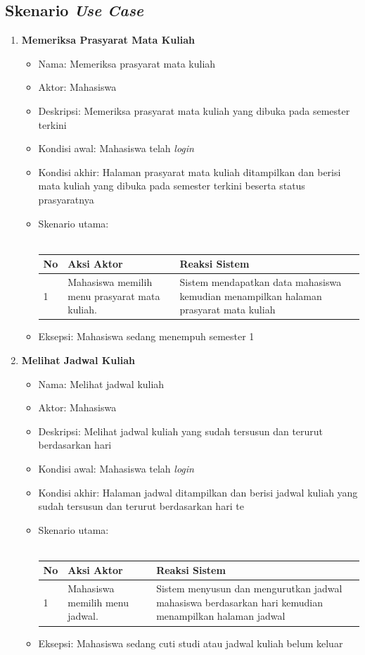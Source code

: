 \subsection{Skenario \textit{Use Case}}

\begin{enumerate}
	\item \textbf{Memeriksa Prasyarat Mata Kuliah}
		\begin{itemize}
			\item Nama: Memeriksa prasyarat mata kuliah
			\item Aktor: Mahasiswa
			\item Deskripsi: Memeriksa prasyarat mata kuliah yang dibuka pada semester terkini
			\item Kondisi awal: Mahasiswa telah \textit{login}
			\item Kondisi akhir: Halaman prasyarat mata kuliah ditampilkan dan berisi mata kuliah yang dibuka pada semester terkini beserta status prasyaratnya
			\item Skenario utama: \\ \\
				\begin{tabular}{|p{0.5cm} |p{6cm}| p{6cm}|}
						\hline
							No 	& Aksi Aktor & Reaksi Sistem \\ \hline
							1 	& Mahasiswa memilih menu prasyarat mata kuliah. 	&	Sistem mendapatkan data mahasiswa kemudian menampilkan halaman prasyarat mata kuliah \\ \hline 
						\end{tabular} 
			\item Eksepsi: Mahasiswa sedang menempuh semester 1
		\end{itemize}
		
	\item \textbf{Melihat Jadwal Kuliah}
		\begin{itemize}
			\item Nama: Melihat jadwal kuliah
			\item Aktor: Mahasiswa
			\item Deskripsi: Melihat jadwal kuliah yang sudah tersusun dan terurut berdasarkan hari
			\item Kondisi awal: Mahasiswa telah \textit{login}
			\item Kondisi akhir: Halaman jadwal ditampilkan dan berisi jadwal kuliah yang sudah tersusun dan terurut berdasarkan hari te
			\item Skenario utama: \\ \\
				\begin{tabular}{|p{0.5cm} |p{6cm}| p{6cm}|}
						\hline
							No 	& Aksi Aktor & Reaksi Sistem \\ \hline
							1 	& Mahasiswa memilih menu jadwal. 	&	Sistem menyusun dan mengurutkan jadwal mahasiswa berdasarkan hari kemudian menampilkan halaman jadwal \\ \hline 
						\end{tabular} 
			\item Eksepsi: Mahasiswa sedang cuti studi atau jadwal kuliah belum keluar
		\end{itemize}
		

\end{enumerate}
